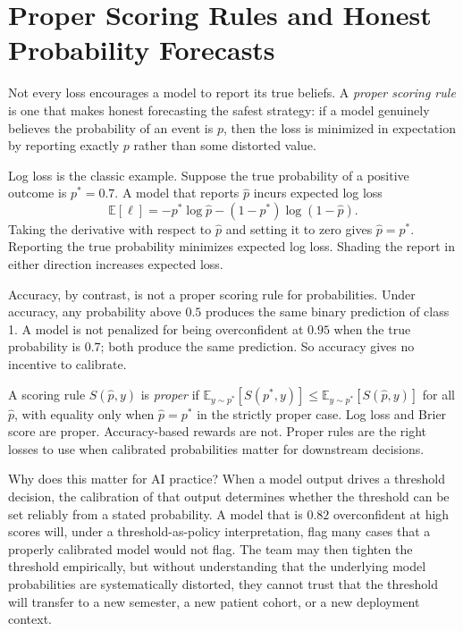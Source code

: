 \section*{Proper Scoring Rules and Honest Probability Forecasts}

Not every loss encourages a model to report its true beliefs. A \emph{proper scoring rule} is one that makes honest forecasting the safest strategy: if a model genuinely believes the probability of an event is $p$, then the loss is minimized in expectation by reporting exactly $p$ rather than some distorted value.

Log loss is the classic example. Suppose the true probability of a positive outcome is $p^* = 0.7$. A model that reports $\hat{p}$ incurs expected log loss
\[
\mathbb{E}[\ell] = -p^* \log \hat{p} - (1-p^*) \log(1-\hat{p}).
\]
Taking the derivative with respect to $\hat{p}$ and setting it to zero gives $\hat{p} = p^*$. Reporting the true probability minimizes expected log loss. Shading the report in either direction increases expected loss.

Accuracy, by contrast, is not a proper scoring rule for probabilities. Under accuracy, any probability above $0.5$ produces the same binary prediction of class 1. A model is not penalized for being overconfident at $0.95$ when the true probability is $0.7$; both produce the same prediction. So accuracy gives no incentive to calibrate.

\begin{mathlens}
A scoring rule $S(\hat{p}, y)$ is \emph{proper} if $\mathbb{E}_{y \sim p^*}[S(p^*, y)] \leq \mathbb{E}_{y \sim p^*}[S(\hat{p}, y)]$ for all $\hat{p}$, with equality only when $\hat{p} = p^*$ in the strictly proper case. Log loss and Brier score are proper. Accuracy-based rewards are not. Proper rules are the right losses to use when calibrated probabilities matter for downstream decisions.
\end{mathlens}

Why does this matter for AI practice? When a model output drives a threshold decision, the calibration of that output determines whether the threshold can be set reliably from a stated probability. A model that is $0.82$ overconfident at high scores will, under a threshold-as-policy interpretation, flag many cases that a properly calibrated model would not flag. The team may then tighten the threshold empirically, but without understanding that the underlying model probabilities are systematically distorted, they cannot trust that the threshold will transfer to a new semester, a new patient cohort, or a new deployment context.


